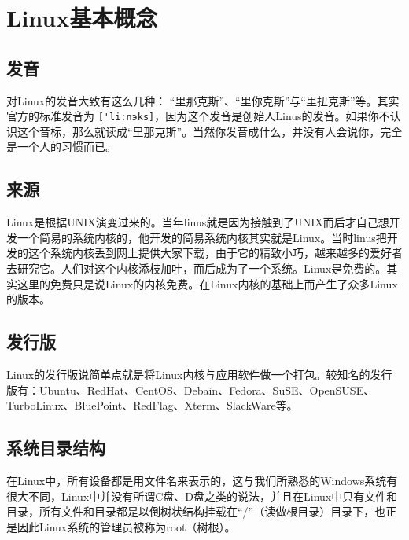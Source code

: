 \chapter{Linux基本概念}
\section{发音}
对Linux的发音大致有这么几种： “里那克斯”、“里你克斯”与“里扭克斯”等。其实官方的标准发音为 \verb|['li:nэks]|，因为这个发音是创始人Linus的发音。如果你不认识这个音标，那么就读成“里那克斯”。当然你发音成什么，并没有人会说你，完全是一个人的习惯而已。


\section{来源}
Linux是根据UNIX演变过来的。当年linus就是因为接触到了UNIX而后才自己想开发一个简易的系统内核的，他开发的简易系统内核其实就是Linux。当时linus把开发的这个系统内核丢到网上提供大家下载，由于它的精致小巧，越来越多的爱好者去研究它。人们对这个内核添枝加叶，而后成为了一个系统。Linux是免费的。其实这里的免费只是说Linux的内核免费。在Linux内核的基础上而产生了众多Linux的版本。


\section{发行版}
Linux的发行版说简单点就是将Linux内核与应用软件做一个打包。较知名的发行版有：Ubuntu、RedHat、CentOS、Debain、Fedora、SuSE、OpenSUSE、TurboLinux、BluePoint、RedFlag、Xterm、SlackWare等。


\section{系统目录结构}
在Linux中，所有设备都是用文件名来表示的，这与我们所熟悉的Windows系统有很大不同，Linux中并没有所谓C盘、D盘之类的说法，并且在Linux中只有文件和目录，所有文件和目录都是以倒树状结构挂载在“/”（读做根目录）目录下，也正是因此Linux系统的管理员被称为root（树根）。

